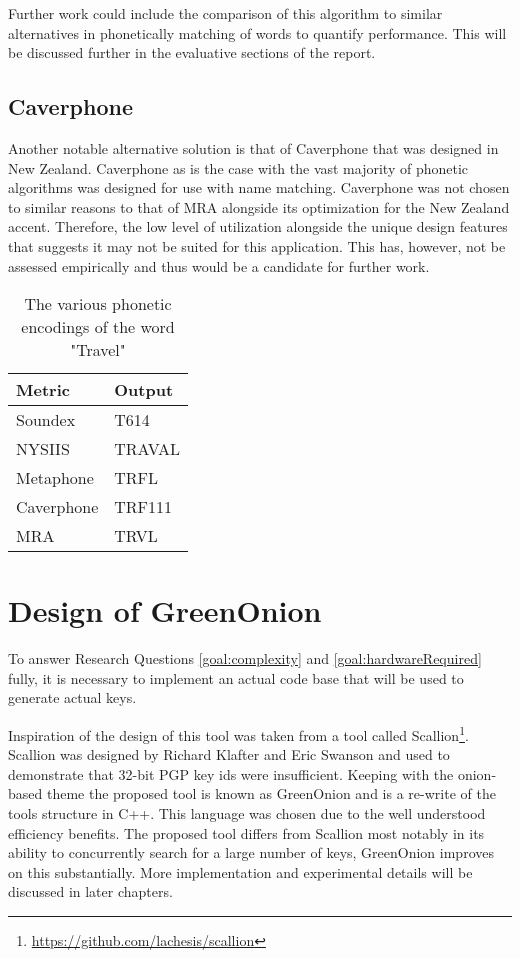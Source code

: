Further work could include the comparison of this algorithm  to similar alternatives in phonetically matching of words to quantify performance. This will be discussed further in the evaluative sections of the report.

\subsection{Caverphone}
Another notable alternative solution is that of Caverphone that was designed in New Zealand. Caverphone as is the case with the vast majority of phonetic algorithms was designed for use with name matching. Caverphone was not chosen to similar reasons to that of MRA alongside its optimization for the New Zealand accent. Therefore, the low level of utilization alongside the unique design features that suggests it may not be suited for this application. This has, however, not be assessed empirically and thus would be a candidate for further work.

\begin{table}[h!]
    \centering
    \begin{tabular}{ll}
        Metric & Output \\
        \hline    
        Soundex & T614 \\
        NYSIIS & TRAVAL\\
        Metaphone & TRFL\\
        Caverphone & TRF111\\
        MRA & TRVL
    \end{tabular}
    \caption{The various phonetic encodings of the word "Travel"}
\end{table}

\section{Design of GreenOnion}
\label{sec:greenDesign}
To answer Research Questions \ref{goal:complexity} and \ref{goal:hardwareRequired} fully, it is necessary to implement an actual code base that will be used to generate actual keys. 

Inspiration of the design of this tool was taken from a tool called Scallion\footnote{\url{https://github.com/lachesis/scallion}}. Scallion was designed by Richard Klafter and Eric Swanson and used to demonstrate that 32-bit PGP key ids were insufficient. Keeping with the onion-based theme the proposed tool is known as GreenOnion and is a re-write of the tools structure in C++. This language was chosen due to the well understood efficiency benefits. The proposed tool differs from Scallion most notably in its ability to concurrently search for a large number of keys, GreenOnion improves on this substantially. More implementation and experimental details will be discussed in later chapters.

